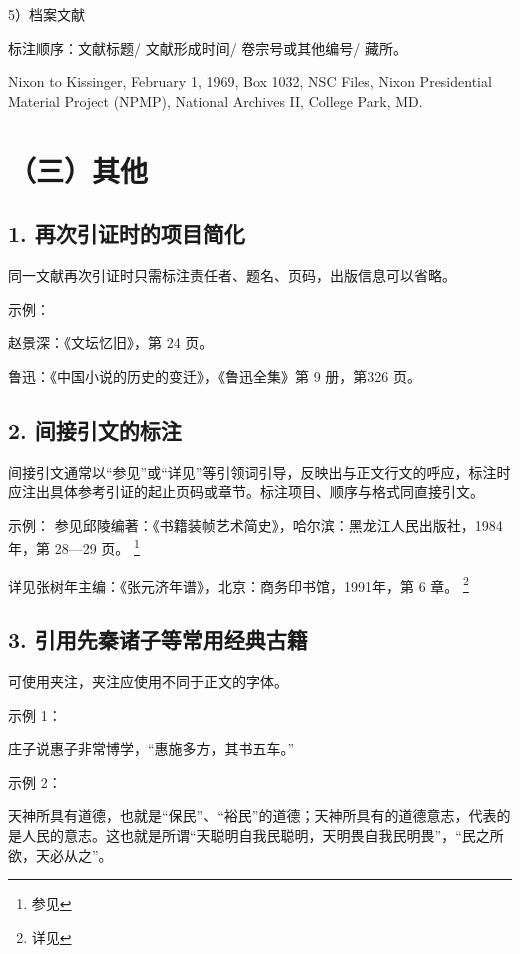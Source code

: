 \documentclass{article}
\begin{document}
5）档案文献

标注顺序：文献标题/ 文献形成时间/ 卷宗号或其他编号/ 藏所。

Nixon to Kissinger, February 1, 1969, Box 1032, NSC Files, Nixon Presidential Material Project (NPMP), National Archives II, College Park, MD.



\section*{（三）其他}

\subsection*{1. 再次引证时的项目简化}

同一文献再次引证时只需标注责任者、题名、页码，出版信息可以省略。

示例：

赵景深：《文坛忆旧》，第 24 页。

鲁迅：《中国小说的历史的变迁》，《鲁迅全集》第 9 册，第326 页。

\subsection*{2. 间接引文的标注}
间接引文通常以“参见”或“详见”等引领词引导，反映出与正文行文的呼应，标注时应注出具体参考引证的起止页码或章节。标注项目、顺序与格式同直接引文。

示例：
参见邱陵编著：《书籍装帧艺术简史》，哈尔滨：黑龙江人民出版社，1984 年，第 28—29 页。
\footnote{参见}

详见张树年主编：《张元济年谱》，北京：商务印书馆，1991年，第 6 章。
\footnote{详见}


\subsection*{3. 引用先秦诸子等常用经典古籍}

可使用夹注，夹注应使用不同于正文的字体。

 示例 1：

 庄子说惠子非常博学，“惠施多方，其书五车。”

 示例 2：

 天神所具有道德，也就是“保民”、“裕民”的道德；天神所具有的道德意志，代表的是人民的意志。这也就是所谓“天聪明自我民聪明，天明畏自我民明畏”，“民之所 欲，天必从之”。









\newpage
{
    \printbibliography

}

    
\end{document}
